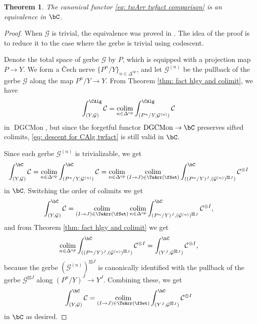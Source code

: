 \documentclass[10pt]{amsart}
\newtheorem{thm}[subsubsection]{Theorem}
\theoremstyle{remark}
\newcommand{\on}{\operatorname}
\newcommand{\cC}{\mathcal{C}}
\newcommand{\cG}{\mathcal{G}}
\newcommand{\DGCatSymMon}{\on{DGCMon}}
\DeclareMathOperator{\op}{op}
\DeclareMathOperator{\colim}{colim}
\begin{document}
\begin{thm}\label{thm: twArr twfact comparison}
    The canonical functor \eqref{eq: twArr twfact comparison}
    is an equivalence in $\bC$.
\end{thm}



\begin{proof}
    When $\cG$ is trivial, the equivalence was proved in \cite[Theorem 1.2.4]{GKRV}.
    The idea of the proof is to reduce it to the case where the gerbe is trivial using codescent. 
\medskip

    
    Denote the total space of gerbe $\cG$ by $P$, which is equipped with a projection map $P\rightarrow Y$. We form a \v{C}ech nerve $\{P^n/Y\}_{n\in\Delta^{\op}}$, and let $\cG^{(n)}$ be the pullback of the gerbe $\cG$ along the map $P^n/Y\rightarrow Y$. From Theorem \ref{thm: fact hlgy and colimit}, we have
    \begin{equation}\label{eq: descent for CAlg twfact}
        \int^{\CAlg}_{(Y,\cG)}\cC = \colim_{n\in \Delta^{\op}} \int^{\CAlg}_{(P^n/Y, \cG^{(n)})}\cC
    \end{equation}
    in $\DGCatSymMon$, but since the forgetful functor $\DGCatSymMon\rightarrow\bC$ preserves sifted colimits, \eqref{eq: descent for CAlg twfact} is still valid in $\bC$.
    \medskip
    
    Since each gerbe $\cG^{(n)}$ is trivializable, we get
    \[\int^{\bC}_{(Y,\cG)}\cC =\colim_{n\in \Delta^{\op}} \int^{\bC}_{(P^n/Y, \cG^{(n)})}\cC= \colim_{n\in \Delta^{\op}} \colim_{(I\rightarrow J)\in \TwArr(\fSet)}\int^{\bC}_{((P^n/Y)^J, (\cG^{(n)})^{\boxtimes J})}\cC^{\otimes I}\]
    in $\bC$.
Switching the order of colimits we get
\begin{equation*}
   \int^{\bC}_{(Y,\cG)}\cC=\colim_{(I\rightarrow J)\in\TwArr(\fSet)}\colim_{n\in \Delta^{\op}} \int^{\bC}_{(P^n/Y)^J, (\cG^{(n)})^{\boxtimes J}}\cC^{\otimes I}, 
\end{equation*}
and from Theorem \ref{thm: fact hlgy and colimit} we get
    \[\colim_{n\in \Delta^{\op}}\int^{\bC}_{((P^n/Y)^J, (\cG^{(n)})^{\boxtimes J})}\cC^{\otimes I} = \int^{\bC}_{(Y^J,\cG^{\boxtimes J})}\cC^{\otimes I},\]
    because the gerbe $(\cG^{(n)})^{\boxtimes J}$ is canonically identified with the pullback of the gerbe $\cG^{\boxtimes J}$ along $(P^n/Y)^J\rightarrow Y^J$.
   Combining these, we get
    \[\int^{\bC}_{(Y,\cG)}\cC = \colim_{(I\rightarrow J)\in \TwArr(\fSet)}\int^{\bC}_{(Y^J,\cG^{\boxtimes J})}\cC^{\otimes I}
    \]
    in $\bC$ as desired.
\end{proof}
\end{document}

